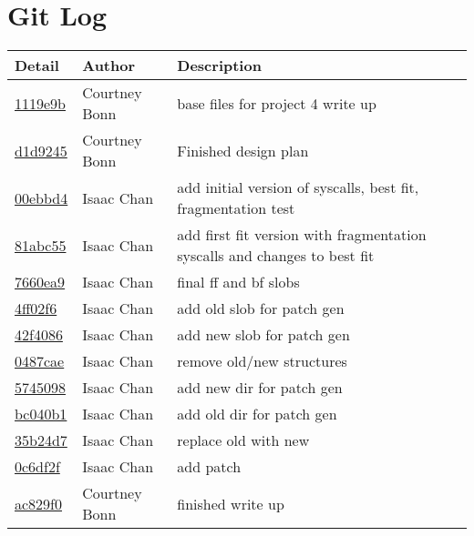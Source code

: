 \documentclass[letterpaper,10pt,draftclsnofoot,onecolumn,titlepage]{IEEEtran}
\begin{document}
\section{Git Log}
\begin{tabular}{p{2cm} p{2cm} p{10cm}}\textbf{Detail} & \textbf{Author} & \textbf{Description}\\\hline
\href{https://github.com/courtbonn/CS-444/commit/1119e9b481cfd36f7ae9b0f153a0a0a330178535}{1119e9b} & Courtney Bonn & base files for project 4 write up\\\hline
\href{https://github.com/courtbonn/CS-444/commit/d1d9245aaebb666dfc4e453694cb1b1829de1066}{d1d9245} & Courtney Bonn & Finished design plan\\\hline
\href{https://github.com/courtbonn/CS-444/commit/00ebbd4bc12fcca0d6ef75dc21d413f1ec019b72}{00ebbd4} & Isaac Chan & add initial version of syscalls, best fit, fragmentation test\\\hline
\href{https://github.com/courtbonn/CS-444/commit/81abc55e1dbec16151f75bbe1eea365782afaff9}{81abc55} & Isaac Chan & add first fit version with fragmentation syscalls and changes to best fit\\\hline
\href{https://github.com/courtbonn/CS-444/commit/7660ea92753305aa055aa774d0017cabb2d89781}{7660ea9} & Isaac Chan & final ff and bf slobs\\\hline
\href{https://github.com/courtbonn/CS-444/commit/4ff02f6f5af2c6a9a15710183e4e707a637da6a2}{4ff02f6} & Isaac Chan & add old slob for patch gen\\\hline
\href{https://github.com/courtbonn/CS-444/commit/42f4086efd0365782a8be2b2373c98ff8152f349}{42f4086} & Isaac Chan & add new slob for patch gen\\\hline
\href{https://github.com/courtbonn/CS-444/commit/0487caef163bc59e81c98488793ea0532da27887}{0487cae} & Isaac Chan & remove old/new structures\\\hline
\href{https://github.com/courtbonn/CS-444/commit/57450982a0ac61bcb86ce4ad15f6a294ae15ac7e}{5745098} & Isaac Chan & add new dir for patch gen\\\hline
\href{https://github.com/courtbonn/CS-444/commit/bc040b179b3dc288a3c1aca104957ebd85623814}{bc040b1} & Isaac Chan & add old dir for patch gen\\\hline
\href{https://github.com/courtbonn/CS-444/commit/35b24d7cf140fdb7527782205e566db8ded5a03e}{35b24d7} & Isaac Chan & replace old with new\\\hline
\href{https://github.com/courtbonn/CS-444/commit/0c6df2f77ffdbc2452623ffcb7d39d0be15d9cfe}{0c6df2f} & Isaac Chan & add patch\\\hline
\href{https://github.com/courtbonn/CS-444/commit/ac829f024c093694b00bde3c321f1b02681d4ca0}{ac829f0} & Courtney Bonn & finished write up\\\hline                   
\end{tabular}
\end{document}
